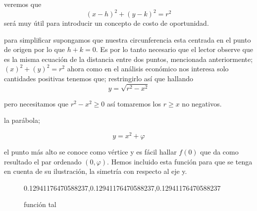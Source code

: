 \documentclass[12pt]{article}
\begin{document}
veremos que $$(x-h)^{2} + (y-k)^{2}=r^{2}$$ será muy útil para introducir un concepto de costo de oportunidad.

para simplificar supongamos que nuestra circunferencia esta centrada en el punto de origen por lo que $h+k=0$. Es por lo tanto necesario que el lector observe que es la misma ecuación de la distancia entre dos puntos, mencionada anteriormente;$(x)^{2}+(y)^{2}=r^{2}$ ahora como en el análisis económico nos interesa solo cantidades positivas tenemos que; restringirlo así que hallando 
$$y=\sqrt{r^{2}-x^{2}}$$

pero necesitamos que $r^{2}-x^{2}\geq 0$ así tomaremos los $r\geq x $  no negativos.







 



\newpage


la parábola; 

$$ y= x^{2} + \varphi $$

el punto más alto se conoce como vértice y es fácil hallar $f(0)$ que da como resultado el par ordenado $(0,\varphi)$. Hemos incluido esta función para que se tenga en cuenta de su ilustración, la simetría con respecto al eje  y.

\begin{figure}

\begin{center}

\definecolor{qqwuqq}{rgb}
{0.12941176470588237,0.12941176470588237,0.12941176470588237}
\label{fig 1}

\caption{función tal}



\end{center}

\end{figure}
\end{document}
